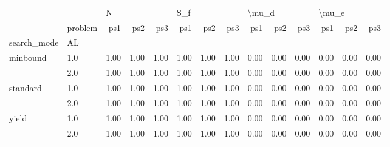 \begin{tabular}{llrrrrrrrrrrrr}
\toprule
      & {} & \multicolumn{3}{l}{N} & \multicolumn{3}{l}{S\_f} & \multicolumn{3}{l}{\textbackslash mu\_d} & \multicolumn{3}{l}{\textbackslash mu\_e} \\
      & problem &  ps1 &  ps2 &  ps3 &  ps1 &  ps2 &  ps3 &   ps1 &  ps2 &  ps3 &   ps1 &  ps2 &  ps3 \\
search\_mode & AL &      &      &      &      &      &      &       &      &      &       &      &      \\
\midrule
minbound & 1.0 & 1.00 & 1.00 & 1.00 & 1.00 & 1.00 & 1.00 &  0.00 & 0.00 & 0.00 &  0.00 & 0.00 & 0.00 \\
      & 2.0 & 1.00 & 1.00 & 1.00 & 1.00 & 1.00 & 1.00 &  0.00 & 0.00 & 0.00 &  0.00 & 0.00 & 0.00 \\
standard & 1.0 & 1.00 & 1.00 & 1.00 & 1.00 & 1.00 & 1.00 &  0.00 & 0.00 & 0.00 &  0.00 & 0.00 & 0.00 \\
      & 2.0 & 1.00 & 1.00 & 1.00 & 1.00 & 1.00 & 1.00 &  0.00 & 0.00 & 0.00 &  0.00 & 0.00 & 0.00 \\
yield & 1.0 & 1.00 & 1.00 & 1.00 & 1.00 & 1.00 & 1.00 &  0.00 & 0.00 & 0.00 &  0.00 & 0.00 & 0.00 \\
      & 2.0 & 1.00 & 1.00 & 1.00 & 1.00 & 1.00 & 1.00 &  0.00 & 0.00 & 0.00 &  0.00 & 0.00 & 0.00 \\
\bottomrule
\end{tabular}
